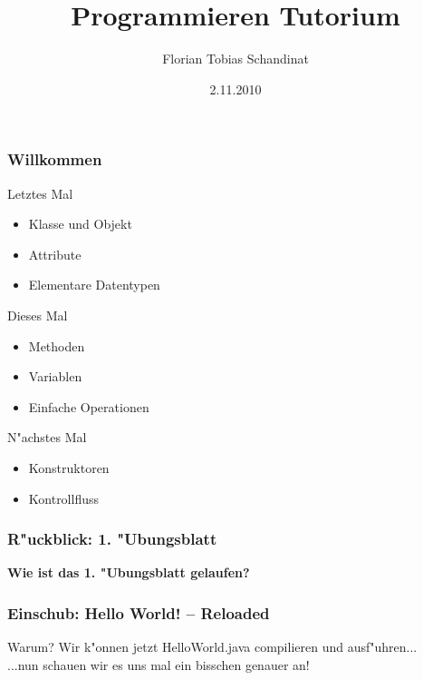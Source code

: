 \documentclass{beamer}
\title{Programmieren Tutorium}
\author{Florian Tobias Schandinat}
\date{2.11.2010}
\institute{FTS}
\begin{document}
\begin{frame}
\frametitle{Willkommen}
\pause
\begin{alertblock}{Letztes Mal}
\begin{itemize}
\item Klasse und Objekt\\
\item Attribute\\
\item Elementare Datentypen
\end{itemize}
\end{alertblock}

\pause

\begin{block}{Dieses Mal}
\begin{itemize}
\item Methoden\\
\item Variablen\\
\item Einfache Operationen
\end{itemize}
\end{block}

\pause

\begin{exampleblock}{N"achstes Mal}
\begin{itemize}
\item Konstruktoren\\
\item Kontrollfluss
\end{itemize}
\end{exampleblock}
\end{frame}


\begin{frame}
\frametitle{R"uckblick: 1. "Ubungsblatt}
\begin{center}
\textbf{\Huge Wie ist das 1. "Ubungsblatt gelaufen?}
\end{center}
\end{frame}


\begin{frame}
\frametitle{Einschub: Hello World! -- Reloaded}
\begin{block}{Warum?}
Wir k"onnen jetzt HelloWorld.java compilieren und ausf"uhren...\pause\\
...nun schauen wir es uns mal ein bisschen genauer an!
\end{block}
\end{frame}
\end{document}
